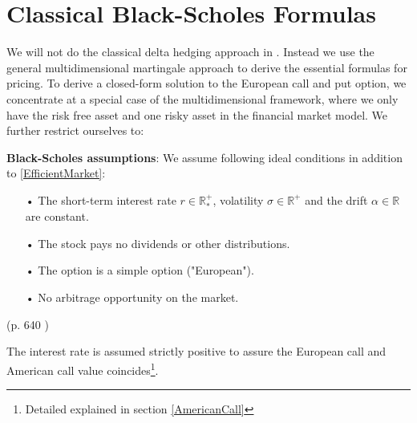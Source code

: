 \section{Classical Black-Scholes Formulas}\label{classicBS}
We will not do the classical delta hedging approach in \parencite{B-S-Paper}. Instead we use the general multidimensional martingale approach to derive the essential formulas for pricing. 
To derive a closed-form solution to the European call and put option, we concentrate at a special case of the multidimensional framework, where we only have the risk free asset and one risky asset in the financial market model. 
We further restrict ourselves to:
\theoremstyle{assumption}
\begin{assumption}{\textbf{Black-Scholes assumptions}:}\label{BS-Assumption}
We assume following ideal conditions in addition to \eqref{EfficientMarket}:
\begin{enumerate}
\item[•] The short-term interest rate $r\in \mathbb{R}^+_*$, volatility $\sigma \in \mathbb{R}^+$ and the drift $\alpha\in \mathbb{R}$ are constant.
\item[•] The stock pays no dividends or other distributions.
\item[•] The option is a simple option ("European").
\item[•] No arbitrage opportunity on the market.
\end{enumerate}
(p. 640 \parencite{B-S-Paper})
\end{assumption}
The interest rate is assumed strictly positive to assure the European call and American call value coincides\footnote{Detailed explained in section \ref{AmericanCall}}.

